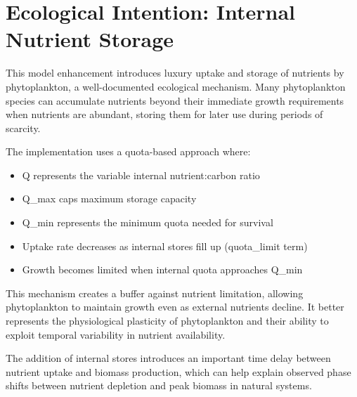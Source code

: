 \section{Ecological Intention: Internal Nutrient Storage}

This model enhancement introduces luxury uptake and storage of nutrients by phytoplankton, a well-documented ecological mechanism. Many phytoplankton species can accumulate nutrients beyond their immediate growth requirements when nutrients are abundant, storing them for later use during periods of scarcity.

The implementation uses a quota-based approach where:
\begin{itemize}
    \item Q represents the variable internal nutrient:carbon ratio
    \item Q\_max caps maximum storage capacity
    \item Q\_min represents the minimum quota needed for survival
    \item Uptake rate decreases as internal stores fill up (quota\_limit term)
    \item Growth becomes limited when internal quota approaches Q\_min
\end{itemize}

This mechanism creates a buffer against nutrient limitation, allowing phytoplankton to maintain growth even as external nutrients decline. It better represents the physiological plasticity of phytoplankton and their ability to exploit temporal variability in nutrient availability.

The addition of internal stores introduces an important time delay between nutrient uptake and biomass production, which can help explain observed phase shifts between nutrient depletion and peak biomass in natural systems.
